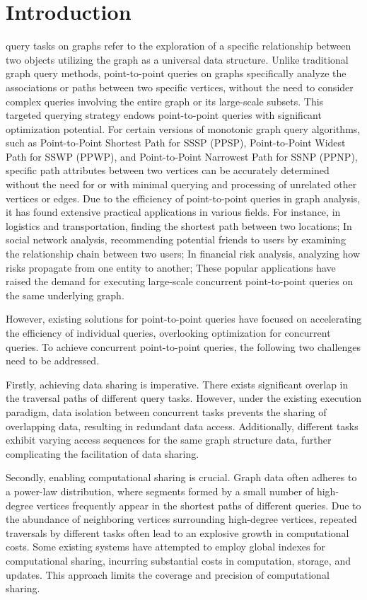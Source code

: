 \documentclass[lettersize,journal]{IEEEtran} %
\begin{document}
\section{Introduction}
 query tasks on graphs refer to the exploration of a specific relationship between two objects utilizing the graph as a universal data structure. Unlike traditional graph query methods, point-to-point queries on graphs specifically analyze the associations or paths between two specific vertices, without the need to consider complex queries involving the entire graph or its large-scale subsets. This targeted querying strategy endows point-to-point queries with significant optimization potential. For certain versions of monotonic graph query algorithms, such as Point-to-Point Shortest Path for SSSP (PPSP), Point-to-Point Widest Path for SSWP (PPWP), and Point-to-Point Narrowest Path for SSNP (PPNP), specific path attributes between two vertices can be accurately determined without the need for or with minimal querying and processing of unrelated other vertices or edges. Due to the efficiency of point-to-point queries in graph analysis, it has found extensive practical applications in various fields. For instance, in logistics and transportation, finding the shortest path between two locations; In social network analysis, recommending potential friends to users by examining the relationship chain between two users; In financial risk analysis, analyzing how risks propagate from one entity to another; These popular applications have raised the demand for executing large-scale concurrent point-to-point queries on the same underlying graph. 

However, existing solutions for point-to-point queries have focused on accelerating the efficiency of individual queries, overlooking optimization for concurrent queries. To achieve concurrent point-to-point queries, the following two challenges need to be addressed.

Firstly, achieving data sharing is imperative. There exists significant overlap in the traversal paths of different query tasks. However, under the existing execution paradigm, data isolation between concurrent tasks prevents the sharing of overlapping data, resulting in redundant data access. Additionally, different tasks exhibit varying access sequences for the same graph structure data, further complicating the facilitation of data sharing.

Secondly, enabling computational sharing is crucial. Graph data often adheres to a power-law distribution, where segments formed by a small number of high-degree vertices frequently appear in the shortest paths of different queries. Due to the abundance of neighboring vertices surrounding high-degree vertices, repeated traversals by different tasks often lead to an explosive growth in computational costs. Some existing systems have attempted to employ global indexes for computational sharing, incurring substantial costs in computation, storage, and updates. This approach limits the coverage and precision of computational sharing.
\end{document}
